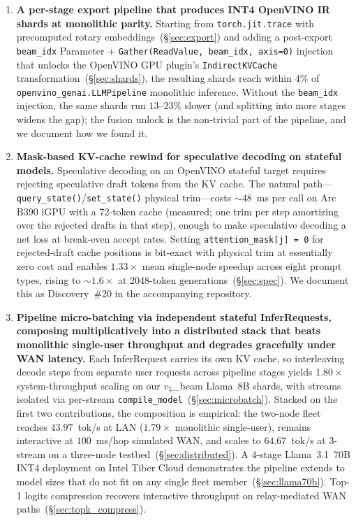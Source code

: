 \documentclass[11pt]{article}
\newcommand{\brk}{\discretionary{}{}{}}
\begin{document}
\begin{enumerate}[leftmargin=*]
  \item \textbf{A per-stage export pipeline that produces INT4 OpenVINO IR shards at monolithic parity.} Starting from \texttt{torch.\brk jit.\brk trace} with precomputed rotary embeddings~(\S\ref{sec:export}) and adding a post-export \texttt{beam\_idx} Parameter + \texttt{Gather(ReadValue, beam\_idx, axis=0)} injection that unlocks the OpenVINO GPU plugin's \texttt{Indirect\brk KVCache} transformation~(\S\ref{sec:shards}), the resulting shards reach within $4\%$ of \texttt{openvino\_genai.LLMPipeline} monolithic inference. Without the \texttt{beam\_idx} injection, the same shards run $13$--$23\%$ slower (and splitting into more stages widens the gap); the fusion unlock is the non-trivial part of the pipeline, and we document how we found it.

  \item \textbf{Mask-based KV-cache rewind for speculative decoding on stateful models.} Speculative decoding on an OpenVINO stateful target requires rejecting speculative draft tokens from the KV cache. The natural path---\texttt{query\_state()}/\texttt{set\_state()} physical trim---costs $\sim 48$~ms per call on Arc B390 iGPU with a 72-token cache (measured; one trim per step amortizing over the rejected drafts in that step), enough to make speculative decoding a net loss at break-even accept rates. Setting \texttt{attention\_\brk mask[j]\,=\,0} for rejected-draft cache positions is bit-exact with physical trim at essentially zero cost and enables $1.33\times$ mean single-node speedup across eight prompt types, rising to ${\sim}1.6\times$ at 2048-token generations~(\S\ref{sec:spec}). We document this as Discovery~\#20 in the accompanying repository.

  \item \textbf{Pipeline micro-batching via independent stateful InferRequests, composing multiplicatively into a distributed stack that beats monolithic single-user throughput and degrades gracefully under WAN latency.} Each InferRequest carries its own KV cache, so interleaving decode steps from separate user requests across pipeline stages yields $1.80\times$ system-throughput scaling on our $v_5$\_beam Llama~8B shards, with streams isolated via per-stream \texttt{compile\_\brk model}~(\S\ref{sec:microbatch}). Stacked on the first two contributions, the composition is empirical: the two-node fleet reaches $43.97$~tok/s at LAN ($1.79\times$ monolithic single-user), remains interactive at $100$~ms/hop simulated WAN, and scales to $64.67$~tok/s at $3$-stream on a three-node testbed~(\S\ref{sec:distributed}). A 4-stage Llama~3.1~70B INT4 deployment on Intel Tiber Cloud demonstrates the pipeline extends to model sizes that do not fit on any single fleet member~(\S\ref{sec:llama70b}). Top-1 logits compression recovers interactive throughput on relay-mediated WAN paths~(\S\ref{sec:topk_compress}).
\end{enumerate}
\end{document}
